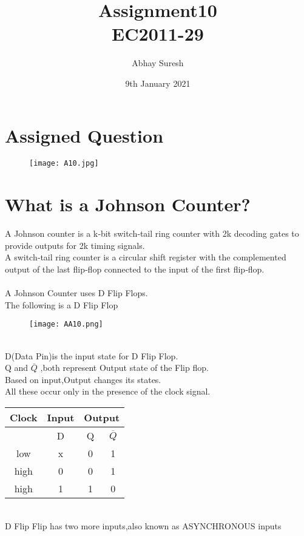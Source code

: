 \documentclass{article}
\title{Assignment10\\EC2011-29}
\author{Abhay Suresh}
\date{9th January 2021}
\begin{document}
\maketitle

\section{Assigned Question}
\begin{figure}[htp]
    \centering
     \texttt{[image: A10.jpg]}
\end{figure}

\section {What is a Johnson Counter?}
A Johnson counter is a k‐bit switch‐tail ring counter with 2k decoding gates to provide outputs for 2k timing signals.\\
A switch‐tail ring counter is a circular shift register with the
complemented output of the last flip‐flop connected to the input of the first flip‐flop.\\\\
A Johnson Counter uses D Flip Flops.\\
The following is a D Flip Flop\\
\begin{figure}[htp]
    \centering
     \texttt{[image: AA10.png]}
\end{figure}
\\
D(Data Pin)is the input state for D Flip Flop.\\
Q and $\bar{Q}$ ,both represent Output state of the Flip flop.\\
Based on input,Output changes its states.\\
All these occur only in the presence of the clock signal.\\
\begin{center}
\begin{tabular}{ |c|c|c|c| }
\hline
{Clock}&{Input}&\multicolumn{2}{|c|}{Output}\\
\hline
 &D&Q&$\overline{Q}$\\
\hline
low&x&0&1\\
high&0&0&1\\
high&1&1&0\\
\hline
\end{tabular}
\end{center}
\\
D Flip Flip has two more inputs,also known as ASYNCHRONOUS inputs\\
\end{document}
